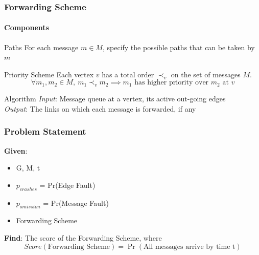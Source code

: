 \documentclass{beamer}
\begin{document}
\begin{frame}
\frametitle{Forwarding Scheme}
	\framesubtitle{Components}
	\begin{block}{Paths}
	For each message $ m\in M $, specify the possible paths that can be taken by $ m $
	\end{block}
	\pause
	\begin{block}{Priority Scheme}
	Each vertex $ v $ has a total order $ \prec _{v} $ on the set of
	messages $ M $. $$\forall m_1,m_2 \in M,\ m_1\prec _{v}m_2 \implies m_1 \text{ has higher priority over } m_2 \text{ at } v$$
	\end{block}
	\pause
	\begin{block}{Algorithm}
	\textit{Input}: Message queue at a vertex, its active out-going edges\\
	\textit{Output}: The links on which each message is forwarded, if any
	\end{block}
\end{frame}

\begin{frame}
\frametitle{Problem Statement}
	\textbf{Given}:
	\begin{itemize}
		\item G, M, t
		\item $p_{crashes}$ = Pr(Edge Fault)
		\item $p_{omission}$ = Pr(Message Fault)
		\item Forwarding Scheme\\[3ex]
	\end{itemize}
	\pause
	\textbf{Find}:
	The score of the Forwarding Scheme, where\\
		$$Score(\text{Forwarding Scheme}) = \Pr(\text{All messages arrive by time t})$$
\end{frame}


\end{document}
